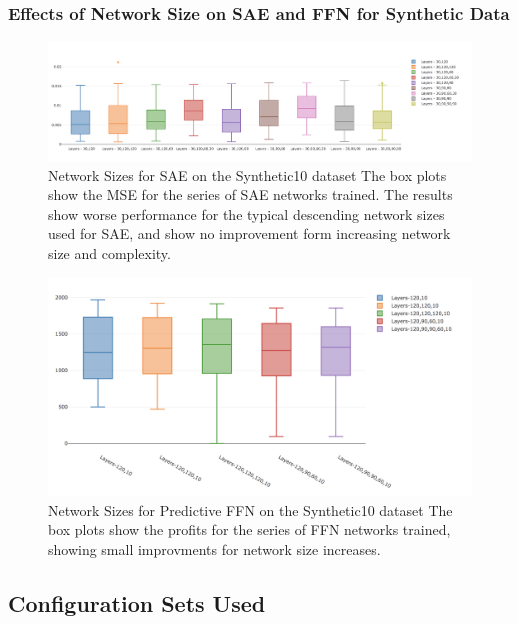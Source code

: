 \documentclass[a4paper,11pt,oneside]{article}
\theoremstyle{plain}
\theoremstyle{definition}
\begin{document}
\subsubsection{Effects of Network Size on SAE and FFN for Synthetic Data}\label{appendix_sae_ffn_network_size}

	\begin{figure}[H]
	\centering \includegraphics[scale=0.3]{images/iteration_four/it4_sae_layers.png}
	\caption{Network Sizes for SAE on the Synthetic10 dataset \newline The box plots show the MSE for the series of SAE networks trained. The results show worse performance for the typical descending network sizes used for SAE, and show no improvement form increasing network size and complexity.}
	\label{figure-appendix-it4_sae_layers}
	\end{figure}
	
	\begin{figure}[H]
		\centering \includegraphics[scale=0.3]{images/iteration_four/it4_ffn_network_size.png}
		\caption{Network Sizes for Predictive FFN on the Synthetic10 dataset \newline The box plots show the profits for the series of FFN networks trained, showing small improvments for network size increases.}
		\label{figure-appendix-it4_ffn_network_size}
	\end{figure}

\subsection{Configuration Sets Used}
\end{document}
